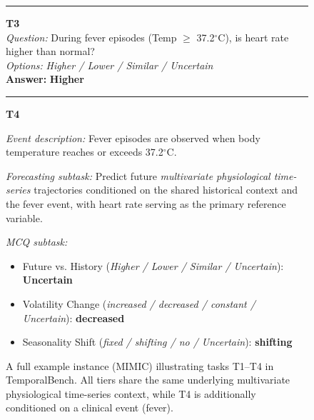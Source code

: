 \begin{figure}[htbp]
\begin{tcolorbox}[
  colback=gray!6,
  colframe=black!20,
  boxrule=0.5pt,
  arc=3pt,
  left=6pt,right=6pt,top=6pt,bottom=6pt
]
\vspace{3pt}\hrule\vspace{4pt}

\textbf{T3} \\
\emph{Question:} During fever episodes (Temp $\ge$ 37.2$^\circ$C), is heart rate higher than normal? \\
\emph{Options:} \textit{Higher / Lower / Similar / Uncertain} \\
\textbf{Answer:} \textbf{Higher}

\vspace{3pt}\hrule\vspace{4pt}

\textbf{T4}

\emph{Event description:}
Fever episodes are observed when body temperature reaches or exceeds 37.2$^\circ$C.

\emph{Forecasting subtask:}
Predict future \emph{multivariate physiological time-series} trajectories conditioned on the shared historical context and the fever event, with heart rate serving as the primary reference variable.

\emph{MCQ subtask:}
\begin{itemize}[leftmargin=1.1em,itemsep=0pt,topsep=0pt,parsep=0pt,partopsep=0pt]
  \item Future vs. History
  (\textit{Higher / Lower / Similar / Uncertain}): \textbf{Uncertain}
  \item Volatility Change
  (\textit{increased / decreased / constant / Uncertain}): \textbf{decreased}
  \item Seasonality Shift
  (\textit{fixed / shifting / no / Uncertain}): \textbf{shifting}
\end{itemize}

\end{tcolorbox}
\caption{A full example instance (MIMIC) illustrating tasks T1--T4 in TemporalBench. All tiers share the same underlying multivariate physiological time-series context, while T4 is additionally conditioned on a clinical event (fever).}
\label{fig:appendix_mimic_one_example}
\end{figure}

